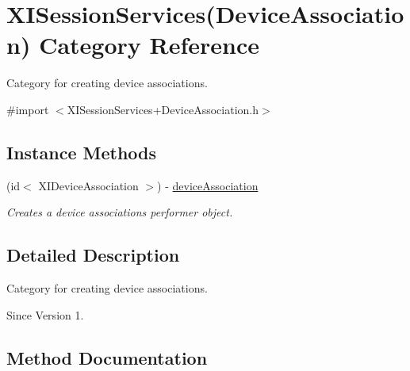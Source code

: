 \hypertarget{category_x_i_session_services_07_device_association_08}{}\section{X\+I\+Session\+Services(Device\+Association) Category Reference}
\label{category_x_i_session_services_07_device_association_08}


Category for creating device associations.  




{\ttfamily \#import $<$X\+I\+Session\+Services+\+Device\+Association.\+h$>$}

\subsection*{Instance Methods}
\begin{DoxyCompactItemize}
\item 
(id$<$ X\+I\+Device\+Association $>$) -\/ \hyperlink{category_x_i_session_services_07_device_association_08_a3ef84a72c6cd443c0df5871bbd61486f}{device\+Association}
\begin{DoxyCompactList}\small\item\em Creates a device associations performer object. \end{DoxyCompactList}\end{DoxyCompactItemize}


\subsection{Detailed Description}
Category for creating device associations. 

\begin{DoxySince}{Since}
Version 1. 
\end{DoxySince}


\subsection{Method Documentation}
\hypertarget{category_x_i_session_services_07_device_association_08_a3ef84a72c6cd443c0df5871bbd61486f}{}\label{category_x_i_session_services_07_device_association_08_a3ef84a72c6cd443c0df5871bbd61486f} 
